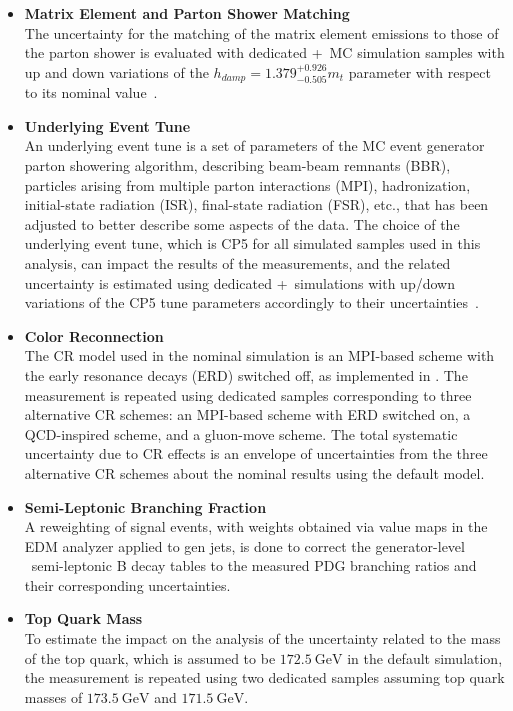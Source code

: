 \begin{refsection}
\begin{itemize}
    \item {\bf Matrix Element and Parton Shower Matching} \\
    The uncertainty for the matching of the matrix element emissions to those of the parton shower is evaluated with dedicated \Powheg+\Pythia\ MC simulation samples with up and down variations of the $h_{damp} = 1.379^{+0.926}_{-0.505}m_t$ parameter with respect to its nominal value~\cite{Sirunyan:2669320}.
    \item {\bf Underlying Event Tune} \\
    An underlying event tune is a set of parameters of the MC event generator parton showering algorithm, describing beam-beam remnants (BBR), particles arising from multiple parton interactions (MPI), hadronization, initial-state radiation (ISR), final-state radiation (FSR), etc., that has been adjusted to better describe some aspects of the data.
    The choice of the underlying event tune, which is CP5 for all simulated samples used in this analysis, can impact the results of the measurements, and the related uncertainty is estimated using dedicated \Powheg+\Pythia\ simulations with up/down variations of the CP5 tune parameters accordingly to their uncertainties~\cite{Sirunyan:2669320}.
    \item {\bf Color Reconnection} \\
    The CR model used in the nominal \ttbar simulation is an MPI-based scheme with the early resonance decays (ERD) switched off, as implemented in \Pythia. 
    The measurement is repeated using dedicated \ttbar samples corresponding to three alternative CR schemes: an MPI-based scheme with ERD switched on, a QCD-inspired scheme, and a gluon-move scheme. 
    The total systematic uncertainty due to CR effects is an envelope of uncertainties from the three alternative CR schemes about the nominal results using the default model.
    \item {\bf Semi-Leptonic Branching Fraction} \\
    A reweighting of \ttbar signal events, with weights obtained via value maps in the EDM analyzer applied to gen jets, is done to correct the generator-level \Pythia\ semi-leptonic B decay tables to the measured PDG branching ratios and their corresponding uncertainties.
    \item {\bf Top Quark Mass} \\
    To estimate the impact on the analysis of the uncertainty related to the mass of the top quark, which is assumed to be $\SI{172.5}{\GeV}$ in the default simulation, the measurement is repeated using two dedicated samples assuming top quark masses of $\SI{173.5}{\GeV}$ and $\SI{171.5}{\GeV}$.

\end{itemize}
\end{refsection}
